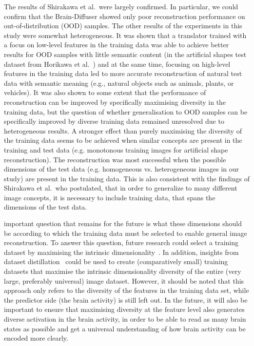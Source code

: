The results of Shirakawa et al.\ were largely confirmed. In particular, we could confirm that the Brain-Diffuser showed only poor reconstruction performance on out-of-distribution (OOD) samples. The other results of the experiments in this study were somewhat heterogeneous. It was shown that a translator trained with a focus on low-level features in the training data was able to achieve better results for OOD samples with little semantic content (in the artificial shapes test dataset from Horikawa et al.~\cite{horikawaGenericDecodingSeen2017}) and at the same time, focusing on high-level features in the training data led to more accurate reconstruction of natural test data with semantic meaning (e.g., natural objects such as animals, plants, or vehicles). It was also shown to some extent that the performance of reconstruction can be improved by specifically maximising diversity in the training data, but the question of whether generalisation to OOD samples can be specifically improved by diverse training data remained unresolved due to heterogeneous results. A stronger effect than purely maximising the diversity of the training data seems to be achieved when similar concepts are present in the training and test data (e.g. monotonous training images for artificial shape reconstruction). The reconstruction was most successful when the possible dimensions of the test data (e.g. homogeneous vs. heterogeneous images in our study) are present in the training data. This is also consistent with the findings of Shirakawa et al.\ who postulated, that in order to generalize to many different image concepts, it is necessary to include training data, that spans the dimensions of the test data.

 important question that remains for the future is what these dimensions should be according to which the training data must be selected to enable general image reconstruction. To answer this question, future research could select a training dataset by maximising the intrinsic dimensionality~\cite{popeIntrinsicDimensionImages2021}. In addition, insights from dataset distillation~\cite{wangDatasetDistillation2018} could be used to create (comparatively small) training datasets that maximise the intrinsic dimensionality diversity of the entire (very large, preferably universal) image dataset. However, it should be noted that this approach only refers to the diversity of the features in the training data set, while the predictor side (the brain activity) is still left out. In the future, it will also be important to ensure that maximising diversity at the feature level also generates diverse activation in the brain activity, in order to be able to read as many brain states as possible and get a universal understanding of how brain activity can be encoded more clearly.
